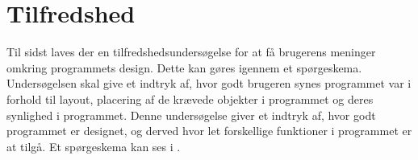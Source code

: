 \section{Tilfredshed}
Til sidst laves der en tilfredshedsundersøgelse for at få brugerens meninger omkring programmets design. 
Dette kan gøres igennem et spørgeskema. 
Undersøgelsen skal give et indtryk af, hvor godt brugeren synes programmet var i forhold til layout, placering af de krævede objekter i programmet og deres synlighed i programmet. 
Denne undersøgelse giver et indtryk af, hvor godt programmet er designet, og derved hvor let forskellige funktioner i programmet er at tilgå. 
Et spørgeskema kan ses i . \citep{UISatisfaction}

